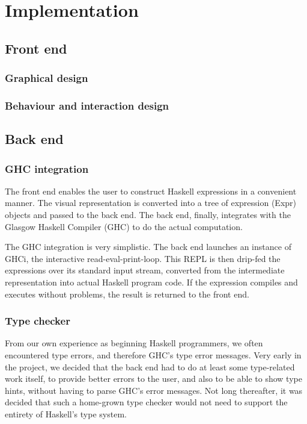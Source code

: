 \chapter{Implementation}

\section{Front end}

\subsection{Graphical design}

\subsection{Behaviour and interaction design}

\section{Back end}

\subsection{GHC integration}

The front end enables the user to construct Haskell expressions in a convenient manner.
The visual representation is converted into a tree of expression (Expr) objects and passed to the back end. 
The back end, finally, integrates with the Glasgow Haskell Compiler (\gls{GHC}) to do the actual computation.

The GHC integration is very simplistic.
The back end launches an instance of GHCi, the interactive read-eval-print-loop. 
This \gls{REPL} is then drip-fed the expressions over its standard input stream, converted from the intermediate representation into actual Haskell program code.
If the expression compiles and executes without problems, the result is returned to the front end.

\subsection{Type checker}

From our own experience as beginning Haskell programmers, we often encountered type errors, and therefore GHC's type error messages.
Very early in the project, we decided that the back end had to do at least some type-related work itself, to provide better errors to the user, and also to be able to show type hints, without having to parse GHC's error messages.
Not long thereafter, it was decided that such a home-grown type checker would not need to support the entirety of Haskell's type system.

